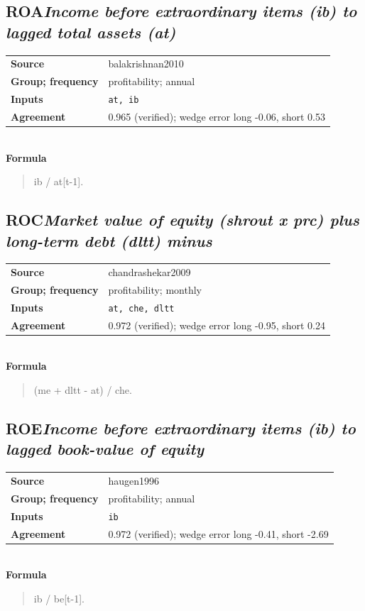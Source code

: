 \documentclass[11pt]{article}
\begin{document}
\subsection*{ROA\quad\normalfont\itshape Income before extraordinary items (ib) to lagged total assets (at)}
\begin{tabular}{@{}p{3.3cm}p{12.3cm}@{}}
\textbf{Source} & balakrishnan2010\\
\textbf{Group; frequency} & profitability; annual\\
\textbf{Inputs} & \texttt{at, ib}\\
\textbf{Agreement} & 0.965 (verified); wedge error long -0.06, short 0.53\\
\end{tabular}\\[4pt]
\textbf{Formula}
\begin{quote}\small
ib / at[t-1].\\

\end{quote}
\subsection*{ROC\quad\normalfont\itshape Market value of equity (shrout x prc) plus long-term debt (dltt) minus}
\begin{tabular}{@{}p{3.3cm}p{12.3cm}@{}}
\textbf{Source} & chandrashekar2009\\
\textbf{Group; frequency} & profitability; monthly\\
\textbf{Inputs} & \texttt{at, che, dltt}\\
\textbf{Agreement} & 0.972 (verified); wedge error long -0.95, short 0.24\\
\end{tabular}\\[4pt]
\textbf{Formula}
\begin{quote}\small
(me + dltt - at) / che.\\

\end{quote}
\subsection*{ROE\quad\normalfont\itshape Income before extraordinary items (ib) to lagged book-value of equity}
\begin{tabular}{@{}p{3.3cm}p{12.3cm}@{}}
\textbf{Source} & haugen1996\\
\textbf{Group; frequency} & profitability; annual\\
\textbf{Inputs} & \texttt{ib}\\
\textbf{Agreement} & 0.972 (verified); wedge error long -0.41, short -2.69\\
\end{tabular}\\[4pt]
\textbf{Formula}
\begin{quote}\small
ib / be[t-1].\\

\end{quote}
\end{document}
